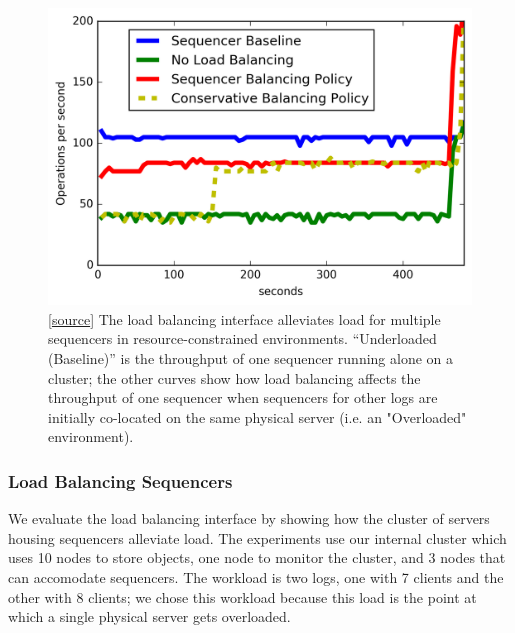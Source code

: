 \documentclass[preprint]{sigplanconf-eurosys}
\begin{document}
\begin{figure}[t!]
\centering
\includegraphics{figures/mantle-seq-thruput.png}
\caption{[\href{https://github.com/double-blind-submitter/osdi16}{source}] The
load balancing interface alleviates load for multiple sequencers in
resource-constrained environments.  ``Underloaded (Baseline)'' is the
throughput of one sequencer running alone on a cluster; the other curves show
how load balancing affects the throughput of one sequencer when sequencers for
other logs are initially co-located on the same physical server (i.e. an
"Overloaded" environment).}\label{fig:mantle-seq-thruput}
\end{figure}

\subsubsection{Load Balancing Sequencers}

We evaluate the load balancing interface by showing how the cluster of servers
housing sequencers alleviate load.  The experiments use our internal cluster
which uses 10 nodes to store objects, one node to monitor the cluster, and 3
nodes that can accomodate sequencers. The workload is two logs, one with 7
clients and the other with 8 clients; we chose this workload because this load
is the point at which a single physical server gets overloaded.
\end{document}
